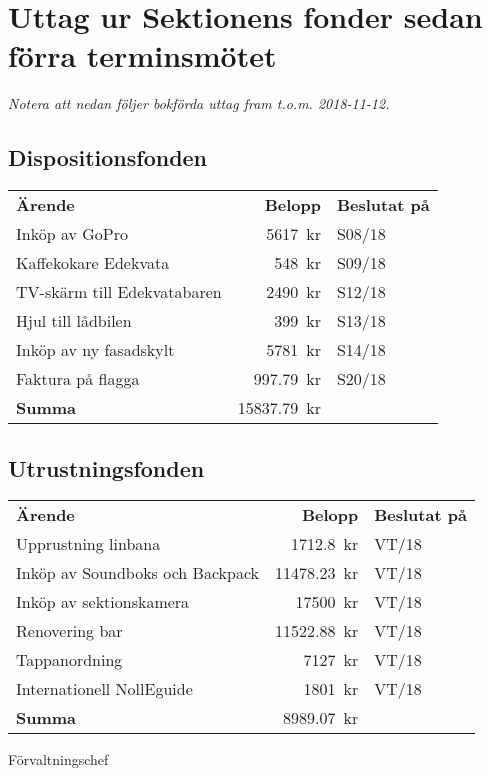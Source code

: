 \documentclass[../_main/handlingar.tex]{subfiles}
\begin{document}
\section{Uttag ur Sektionens fonder sedan förra terminsmötet}
\emph{Notera att nedan följer bokförda uttag fram t.o.m. 2018-11-12.}

\subsection*{Dispositionsfonden}
\begin{tabular}{l r l}
    \textbf{Ärende} & \textbf{Belopp} & \textbf{Beslutat på} \\
    Inköp av GoPro & \SI{5617}{kr} & S08/18 \\
    Kaffekokare Edekvata & \SI{548}{kr} & S09/18 \\
    TV-skärm till Edekvatabaren & \SI{2490}{kr} & S12/18 \\
    Hjul till lådbilen & \SI{399}{kr} & S13/18 \\
    Inköp av ny fasadskylt & \SI{5781}{kr} & S14/18 \\
    Faktura på flagga & \SI{997,79}{kr} & S20/18 \\
    \hline
    \textbf{Summa} & \SI{15 837,79}{kr} \\
\end{tabular}

\subsection*{Utrustningsfonden}
\begin{tabular}{l r l}
    \textbf{Ärende} & \textbf{Belopp} & \textbf{Beslutat på} \\
    Upprustning linbana & \SI{1712,8}{kr} & VT/18 \\
    Inköp av Soundboks och Backpack & \SI{11478,23}{kr} & VT/18 \\
    Inköp av sektionskamera & \SI{17500}{kr} & VT/18 \\
    Renovering bar & \SI{11522,88}{kr} & VT/18 \\
    Tappanordning & \SI{7127}{kr} & VT/18 \\
    Internationell NollEguide & \SI{1801}{kr} & VT/18 \\
    \hline
    \textbf{Summa} & \SI{8989,07}{kr} \\
\end{tabular}

\begin{signatures}{1}
    \ist
    \signature{Magnus Lundh}{Förvaltningschef}
\end{signatures}
\end{document}
